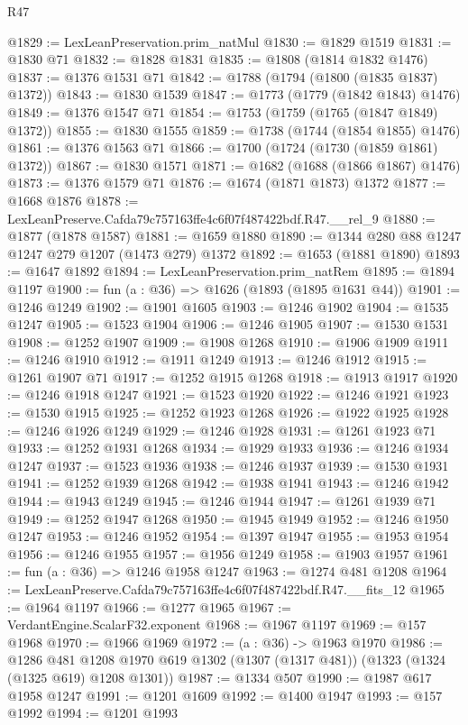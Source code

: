 \begin{lexlean}{R47}
\begin{coremodule}
@1829 := LexLeanPreservation.prim_natMul
@1830 := @1829 @1519
@1831 := @1830 @71
@1832 := @1828 @1831
@1835 := @1808 (@1814 @1832 @1476)
@1837 := @1376 @1531 @71
@1842 := @1788 (@1794 (@1800 (@1835 @1837) @1372))
@1843 := @1830 @1539
@1847 := @1773 (@1779 (@1842 @1843) @1476)
@1849 := @1376 @1547 @71
@1854 := @1753 (@1759 (@1765 (@1847 @1849) @1372))
@1855 := @1830 @1555
@1859 := @1738 (@1744 (@1854 @1855) @1476)
@1861 := @1376 @1563 @71
@1866 := @1700 (@1724 (@1730 (@1859 @1861) @1372))
@1867 := @1830 @1571
@1871 := @1682 (@1688 (@1866 @1867) @1476)
@1873 := @1376 @1579 @71
@1876 := @1674 (@1871 @1873) @1372
@1877 := @1668 @1876
@1878 := LexLeanPreserve.Cafda79c757163ffe4c6f07f487422bdf.R47.__rel_9
@1880 := @1877 (@1878 @1587)
@1881 := @1659 @1880
@1890 := @1344 @280 @88 @1247 @1247 @279 @1207 (@1473 @279) @1372
@1892 := @1653 (@1881 @1890)
@1893 := @1647 @1892
@1894 := LexLeanPreservation.prim_natRem
@1895 := @1894 @1197
@1900 := fun (a : @36) => @1626 (@1893 (@1895 @1631 @44))
@1901 := @1246 @1249
@1902 := @1901 @1605
@1903 := @1246 @1902
@1904 := @1535 @1247
@1905 := @1523 @1904
@1906 := @1246 @1905
@1907 := @1530 @1531
@1908 := @1252 @1907
@1909 := @1908 @1268
@1910 := @1906 @1909
@1911 := @1246 @1910
@1912 := @1911 @1249
@1913 := @1246 @1912
@1915 := @1261 @1907 @71
@1917 := @1252 @1915 @1268
@1918 := @1913 @1917
@1920 := @1246 @1918 @1247
@1921 := @1523 @1920
@1922 := @1246 @1921
@1923 := @1530 @1915
@1925 := @1252 @1923 @1268
@1926 := @1922 @1925
@1928 := @1246 @1926 @1249
@1929 := @1246 @1928
@1931 := @1261 @1923 @71
@1933 := @1252 @1931 @1268
@1934 := @1929 @1933
@1936 := @1246 @1934 @1247
@1937 := @1523 @1936
@1938 := @1246 @1937
@1939 := @1530 @1931
@1941 := @1252 @1939 @1268
@1942 := @1938 @1941
@1943 := @1246 @1942
@1944 := @1943 @1249
@1945 := @1246 @1944
@1947 := @1261 @1939 @71
@1949 := @1252 @1947 @1268
@1950 := @1945 @1949
@1952 := @1246 @1950 @1247
@1953 := @1246 @1952
@1954 := @1397 @1947
@1955 := @1953 @1954
@1956 := @1246 @1955
@1957 := @1956 @1249
@1958 := @1903 @1957
@1961 := fun (a : @36) => @1246 @1958 @1247
@1963 := @1274 @481 @1208
@1964 := LexLeanPreserve.Cafda79c757163ffe4c6f07f487422bdf.R47.__fits_12
@1965 := @1964 @1197
@1966 := @1277 @1965
@1967 := VerdantEngine.ScalarF32.exponent
@1968 := @1967 @1197
@1969 := @157 @1968
@1970 := @1966 @1969
@1972 := (a : @36) -> @1963 @1970
@1986 := @1286
    @481
    @1208
    @1970
    @619
    @1302
    (@1307 (@1317 @481))
    (@1323 (@1324 (@1325 @619) @1208 @1301))
@1987 := @1334 @507
@1990 := @1987 @617 @1958 @1247
@1991 := @1201 @1609
@1992 := @1400 @1947
@1993 := @157 @1992
@1994 := @1201 @1993

\end{coremodule}
\end{lexlean}
